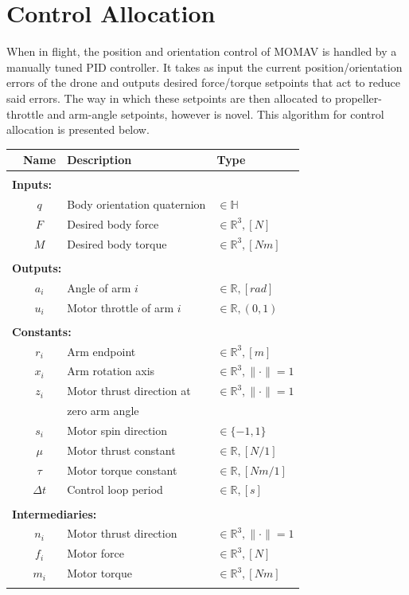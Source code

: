\documentclass[conference]{IEEEtran}
\begin{document}
\section{Control Allocation}
When in flight, the position and orientation control of MOMAV is handled by a manually tuned PID controller. It takes as input the current position/orientation errors of the drone and outputs desired force/torque setpoints that act to reduce said errors. The way in which these setpoints are then allocated to propeller-throttle and arm-angle setpoints, however is novel. This algorithm for control allocation is presented below.
\vspace{12pt}\par 
\begin{center}
	\begin{tabular}{ l c l l }
		\hline
		& Name & Description & Type \\ 
		\hline
		\\[-8pt] \multicolumn{4}{l}{\textbf{Inputs:}} \\
		& $q$ & Body orientation quaternion & $\in \mathbb{H}$ \\
		& $F$ & Desired body force & $\in \mathbb{R}^3, [N]$ \\
		& $M$ & Desired body torque & $\in \mathbb{R}^3, [Nm]$ \\
		\\[-8pt] \multicolumn{4}{l}{\textbf{Outputs:}} \\
		& $a_i$ & Angle of arm $i$ & $\in \mathbb{R}, [rad]$ \\
		& $u_i$ & Motor throttle of arm $i$ & $\in \mathbb{R}, (0,1)$ \\
		\\[-8pt] \multicolumn{4}{l}{\textbf{Constants:}} \\
		& $r_i$ & Arm endpoint & $\in \mathbb{R}^3, [m]$ \\ 
		& $x_i$ & Arm rotation axis & $\in \mathbb{R}^3, \lVert \cdot \rVert=1$ \\
		& $z_i$ & Motor thrust direction at & $\in \mathbb{R}^3, \lVert \cdot \rVert=1$ \\
		& & zero arm angle & \\
		& $s_i$ & Motor spin direction & $\in \{-1, 1\}$ \\
		& $\mu$ & Motor thrust constant & $\in \mathbb{R}, [N/1]$ \\
		& $\tau$ & Motor torque constant & $\in \mathbb{R}, [Nm/1]$ \\
		& $\Delta t$ & Control loop period & $\in \mathbb{R}, [s]$ \\
		\\[-8pt] \multicolumn{4}{l}{\textbf{Intermediaries:}} \\
		& $n_i$ & Motor thrust direction & $\in \mathbb{R}^3, \lVert \cdot \rVert=1$ \\
		& $f_i$ & Motor force & $\in \mathbb{R}^3, [N]$ \\
		& $m_i$ & Motor torque & $\in \mathbb{R}^3, [Nm]$ \\
		\\[-8pt]
		\hline
	\end{tabular}
\end{center}
\end{document}
